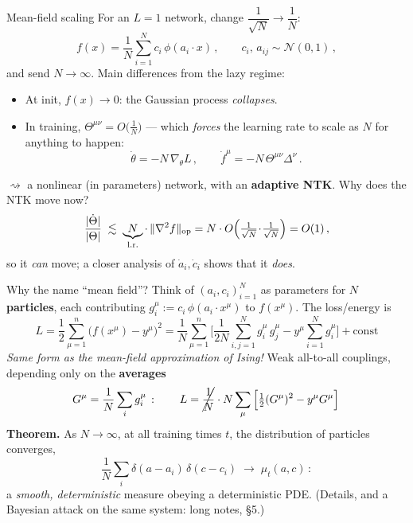\documentclass[11pt]{beamer}
\newcommand{\hl}[1]{{\color{blue!60!black}\textbf{#1}}}
\begin{document}
\begin{frame}{Mean-field scaling}
  For an $L=1$ network, change $\dfrac{1}{\sqrt N} \to \dfrac1N$:
  \[
    f(x) = \frac1N \sum_{i=1}^N c_i\,\phi(a_i\cdot x)\,,\qquad
    c_i,\, a_{ij} \sim \mathcal N(0,1)\,,
  \]
  and send $N\to\infty$.  \pause  Main differences from the lazy regime:
  \begin{itemize}
    \item At init, $f(x) \to 0$: the Gaussian process \emph{collapses}. \pause
    \item In training, $\Theta^{\mu\nu} = O\big(\tfrac1N\big)$ ---
      which \emph{forces} the learning rate to scale as $N$ for anything to happen:
      \[
        \dot\theta = -N\,\nabla_\theta L\,,\qquad
        \dot f^\mu = -N\,\Theta^{\mu\nu}\Delta^\nu\,.
      \] \pause
  \end{itemize}
  $\rightsquigarrow$ a nonlinear (in parameters) network, with an
  \hl{adaptive NTK}.  \pause  Why does the NTK move now?
  \[
    \frac{|\dot\Theta|}{|\Theta|} \;\lesssim\;
    \underbrace{N}_{\text{l.r.}}\cdot\,
    \|\nabla^2 f\|_{\rm op}
    = N\cdot O\Big(\tfrac{1}{\sqrt N}\!\cdot\!\tfrac{1}{\sqrt N}\Big) = O(1)\,,
  \]
  so it \emph{can} move; a closer analysis of $\dot a_i, \dot c_i$ shows that it \emph{does}.
\end{frame}

\begin{frame}{Why the name ``mean field''?}
  Think of $(a_i, c_i)_{i=1}^N$ as parameters for \hl{$N$ particles},
  each contributing $g^\mu_i := c_i\,\phi(a_i\cdot x^\mu)$ to
  $f(x^\mu)$. The loss/energy is
  \[
    L = \frac12\sum_{\mu=1}^n \big(f(x^\mu) - y^\mu\big)^2
    = \frac1N \sum_{\mu=1}^n \Big[\frac{1}{2N}\sum_{i,j=1}^N
    g^\mu_i\, g^\mu_j
    - y^\mu \sum_{i=1}^N g^\mu_i\Big] + \text{const}
  \] \pause
  \emph{Same form as the mean-field approximation of Ising!} Weak
  all-to-all couplings, depending only on the \hl{averages}
  \[
    G^\mu = \frac1N\sum_i g^\mu_i\,:\qquad
    L = \cancel{\frac1N} \cdot N \sum_\mu \Big[\tfrac12 (G^\mu)^2 - y^\mu
    G^\mu\Big]\,
  \]  \pause
  \textbf{Theorem.} As $N\to\infty$, at all training times $t$, the
  distribution of particles converges,
  \[
    {\frac1N}\sum_i \delta(a - a_i)\,\delta(c - c_i)
    \;\longrightarrow\; \mu_t(a,c)\,:
  \]
  a \emph{smooth, deterministic} measure obeying a deterministic PDE.
  {\footnotesize (Details, and a Bayesian attack on the same system:
  long notes, \S5.)}
\end{frame}
\end{document}
